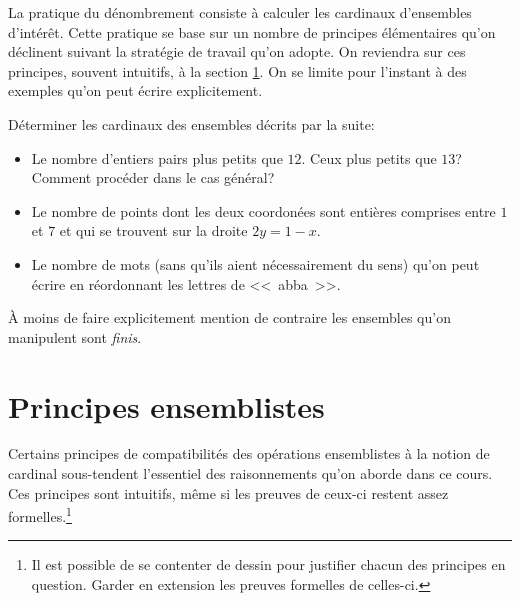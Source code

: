 \documentclass[12pt, a4paper]{article}
\begin{document}
La pratique du dénombrement consiste à calculer les cardinaux
d'ensembles d'intérêt. Cette pratique se base sur un nombre de
principes élémentaires qu'on déclinent suivant la stratégie de travail
qu'on adopte. On reviendra sur ces principes, souvent intuitifs, à la
section \ref{sec:principesEns}. On se limite pour l'instant à des
exemples qu'on peut écrire explicitement.

\begin{question}
  Déterminer les cardinaux des ensembles décrits par la suite:
  \begin{itemize}
  \item Le nombre d'entiers pairs plus petits que $12$. Ceux plus
    petits que $13$? Comment procéder dans le cas général?
  \item Le nombre de points dont les deux coordonées sont entières
    comprises entre $1$ et $7$ et qui se trouvent sur la droite
    $ 2y = 1 - x$.
  \item Le nombre de mots (sans qu'ils aient nécessairement du sens)
    qu'on peut écrire en réordonnant les lettres de <<~abba~>>.
  \end{itemize}
\end{question}

\begin{hyp}
  À moins de faire explicitement mention de contraire les ensembles
  qu'on manipulent sont \emph{finis}.
\end{hyp}

\section{Principes ensemblistes}

\label{sec:principesEns}
Certains principes de compatibilités des opérations ensemblistes à la
notion de cardinal sous-tendent l'essentiel des raisonnements qu'on
aborde dans ce cours. Ces principes sont intuitifs, même si les
preuves de ceux-ci restent assez formelles.\footnote{Il est possible
  de se contenter de dessin pour justifier chacun des principes en
  question. Garder en extension les preuves formelles de celles-ci.}
\end{document}
